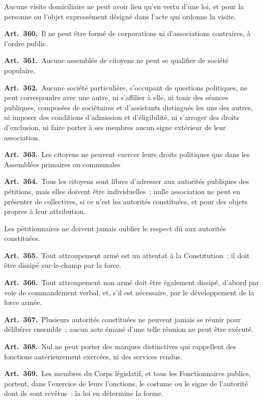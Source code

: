 \documentclass[french,twoside]{book} %
\newcommand{\labelchar}[1]{\textbf{\color{rubric} #1}}
\begin{document}
Aucune visite domiciliaire ne peut avoir lieu qu’en vertu d’une loi, et pour la personne ou l’objet expressément désigné dans l’acte qui ordonne la visite.\par
\labelchar{Art. 360.} Il ne peut être formé de corporations ni d’associations contraires, à l’ordre public.\par
\labelchar{Art. 361.} Aucune assemblée de citoyens ne peut se qualifier de société populaire.\par
\labelchar{Art. 362.} Aucune société particulière, s’occupant de questions politiques, ne peut correspondre avec une autre, ni s’affilier à elle, ni tenir des séances publiques, composées de sociétaires et d’assistants distingués les uns des autres, ni imposer des conditions d’admission et d’éligibilité, ni s’arroger des droits d’exclusion, ni faire porter à ses membres aucun signe extérieur de leur association.\par
\labelchar{Art. 363.} Les citoyens ne peuvent exercer leurs droits politiques que dans les Assemblées primaires ou communales\par
\labelchar{Art. 364.} Tous les citoyens sont libres d’adresser aux autorités publiques des pétitions, mais elles doivent être individuelles ; nulle association ne peut en présenter de collectives, si ce n’est les autorités constituées, et pour des objets propres à leur attribution.\par
Les pétitionnaires ne doivent jamais oublier le respect dû aux autorités constituées.\par
\labelchar{Art. 365.} Tout attroupement armé est un attentat à la Constitution ; il doit être dissipé sur-le-champ par la force.\par
\labelchar{Art. 366.} Tout attroupement non armé doit être également dissipé, d’abord par voie de commandement verbal, et, s’il est nécessaire, par le développement de la force armée.\par
\labelchar{Art. 367.} Plusieurs autorités constituées ne peuvent jamais se réunir pour délibérer ensemble ; aucun acte émané d’une telle réunion ne peut être exécuté.\par
\labelchar{Art. 368.} Nul ne peut porter des marques distinctives qui rappellent des fonctions antérieurement exercées, ni des services rendus.\par
\labelchar{Art. 369.} Les membres du Corps législatif, et tous les Fonctionnaires publics, portent, dans l’exercice de leurs l’onctions, le costume ou le signe de l’autorité dont ils sont revêtus : la loi en détermine la forme.\par
\end{document}
